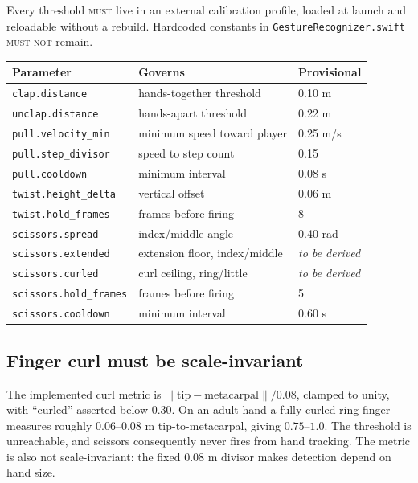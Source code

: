 \documentclass[11pt,a4paper]{article}
\newcommand{\MUST}{\textsc{must}}
\newcommand{\MUSTNOT}{\textsc{must not}}
\theoremstyle{definition}
\theoremstyle{plain}
\theoremstyle{remark}
\begin{document}
Every threshold \MUST{} live in an external calibration profile, loaded at launch and reloadable
without a rebuild. Hardcoded constants in \texttt{GestureRecognizer.swift} \MUSTNOT{} remain.

\begin{center}
\begin{tabular}{lll}
\toprule
\textbf{Parameter} & \textbf{Governs} & \textbf{Provisional} \\
\midrule
\texttt{clap.distance}        & hands-together threshold      & 0.10 m \\
\texttt{unclap.distance}      & hands-apart threshold         & 0.22 m \\
\texttt{pull.velocity\_min}   & minimum speed toward player   & 0.25 m/s \\
\texttt{pull.step\_divisor}   & speed to step count           & 0.15 \\
\texttt{pull.cooldown}        & minimum interval              & 0.08 s \\
\texttt{twist.height\_delta}  & vertical offset               & 0.06 m \\
\texttt{twist.hold\_frames}   & frames before firing          & 8 \\
\texttt{scissors.spread}      & index/middle angle            & 0.40 rad \\
\texttt{scissors.extended}    & extension floor, index/middle & \emph{to be derived} \\
\texttt{scissors.curled}      & curl ceiling, ring/little     & \emph{to be derived} \\
\texttt{scissors.hold\_frames}& frames before firing          & 5 \\
\texttt{scissors.cooldown}    & minimum interval              & 0.60 s \\
\bottomrule
\end{tabular}
\end{center}

\subsection{Finger curl must be scale-invariant}

The implemented curl metric is $\lVert \text{tip} - \text{metacarpal} \rVert / 0.08$, clamped to
unity, with ``curled'' asserted below $0.30$. On an adult hand a fully curled ring finger measures
roughly $0.06$--$0.08$ m tip-to-metacarpal, giving $0.75$--$1.0$. The threshold is unreachable, and
scissors consequently never fires from hand tracking. The metric is also not scale-invariant: the
fixed $0.08$ m divisor makes detection depend on hand size.
\end{document}
